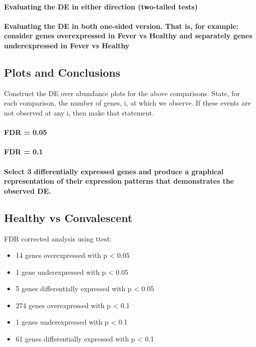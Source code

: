 \documentclass[a4paper]{article}
\begin{document}
\paragraph{Evaluating the DE in either direction (two-tailed tests)}

\paragraph{Evaluating the DE in both one-sided version. That is, for example: consider genes overexpressed in Fever vs Healthy and separately genes underexpressed in Fever vs Healthy}

\subsection{Plots and Conclusions}

Construct the DE over abundance plots for the above comparisons.
State, for each comparison, the number of genes, i, at which we observe.
If these events are not observed at any i, then make that statement.

\paragraph{FDR = 0.05}

\paragraph{FDR = 0.1}

\paragraph{Select 3 differentially expressed genes and produce a graphical representation of their expression patterns that demonstrates the observed DE.}

\clearpage
\subsection{Healthy vs Convalescent}

FDR corrected analysis using ttest:

\begin{itemize}
  \item 14 genes overexpressed with p < 0.05
  \item 1 gene underexpressed with p < 0.05
  \item 5 genes differentially expressed with p < 0.05
  \item 274 genes overexpressed with p < 0.1
  \item 1 genes underexpressed with p < 0.1
  \item 61 genes differentially expressed with p < 0.1
\end{itemize}
\end{document}
